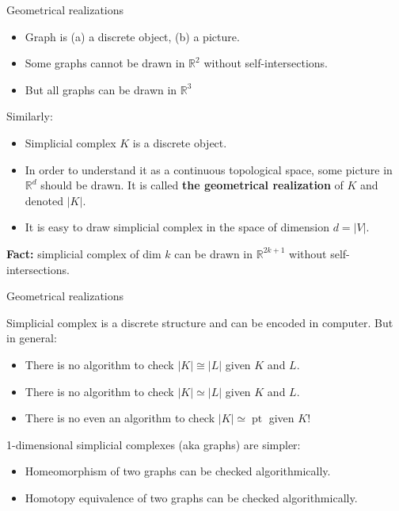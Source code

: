 \documentclass[10pt]{beamer}
\DeclareMathOperator{\pt}{pt}
\newcommand{\Ro}{\mathbb{R}}
\begin{document}
\begin{frame}{Geometrical realizations}

\begin{itemize}
  \item Graph is (a) a discrete object, (b) a picture.
  \item Some graphs cannot be drawn in $\Ro^2$ without self-intersections.
  \item But all graphs can be drawn in $\Ro^3$
\end{itemize}\pause
Similarly:
\begin{itemize}
  \item Simplicial complex $K$ is a discrete object.\pause
  \item In order to understand it as a continuous topological space, some picture in $\Ro^d$ should be drawn. It is called \textbf{the geometrical realization} of $K$ and denoted $|K|$.\pause
  \item It is easy to draw simplicial complex in the space of dimension $d=|V|$.
\end{itemize}

\textbf{Fact:} simplicial complex of dim $k$ can be drawn in $\Ro^{2k+1}$ without self-intersections.

\end{frame}

\begin{frame}{Geometrical realizations}

Simplicial complex is a discrete structure and can be encoded in computer. But in general:

\begin{itemize}
  \item There is no algorithm to check $|K|\cong |L|$ given $K$ and $L$.
  \item There is no algorithm to check $|K|\simeq |L|$ given $K$ and $L$.
  \item There is no even an algorithm to check $|K|\simeq\pt$ given $K$!
\end{itemize}

1-dimensional simplicial complexes (aka graphs) are simpler:
\begin{itemize}
  \item Homeomorphism of two graphs can be checked algorithmically.
  \item Homotopy equivalence of two graphs can be checked algorithmically.
\end{itemize}

\end{frame}
\end{document}
